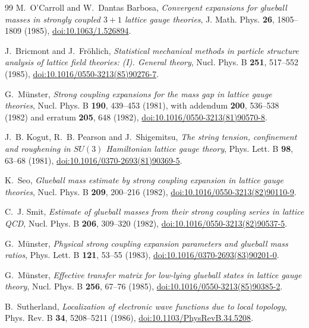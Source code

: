 \documentclass[11pt]{article}
\theoremstyle{plain}
\theoremstyle{definition}
\theoremstyle{remark}
\begin{document}
\begin{thebibliography}{99}
 M.~O'Carroll and W.~Dantas Barbosa,
  \emph{Convergent expansions for glueball masses in strongly coupled
  $3+1$ lattice gauge theories}, J. Math. Phys. \textbf{26}, 1805--1809
  (1985),
  \href{https://doi.org/10.1063/1.526894}{doi:10.1063/1.526894}.

 J.~Bricmont and J.~Fr\"ohlich,
  \emph{Statistical mechanical methods in particle structure analysis of
  lattice field theories: (I). General theory}, Nucl. Phys. B \textbf{251},
  517--552 (1985),
  \href{https://doi.org/10.1016/0550-3213(85)90276-7}{doi:10.1016/0550-3213(85)90276-7}.

 G.~M\"unster,
  \emph{Strong coupling expansions for the mass gap in lattice gauge theories},
  Nucl. Phys. B \textbf{190}, 439--453 (1981), with addendum
  \textbf{200}, 536--538 (1982) and erratum \textbf{205}, 648 (1982),
  \href{https://doi.org/10.1016/0550-3213(81)90570-8}{doi:10.1016/0550-3213(81)90570-8}.

 J.~B. Kogut, R.~B. Pearson and J.~Shigemitsu,
  \emph{The string tension, confinement and roughening in $SU(3)$ Hamiltonian
  lattice gauge theory}, Phys. Lett. B \textbf{98}, 63--68 (1981),
  \href{https://doi.org/10.1016/0370-2693(81)90369-5}{doi:10.1016/0370-2693(81)90369-5}.

 K.~Seo,
  \emph{Glueball mass estimate by strong coupling expansion in lattice gauge
  theories}, Nucl. Phys. B \textbf{209}, 200--216 (1982),
  \href{https://doi.org/10.1016/0550-3213(82)90110-9}{doi:10.1016/0550-3213(82)90110-9}.

 C.~J. Smit,
  \emph{Estimate of glueball masses from their strong coupling series in
  lattice QCD}, Nucl. Phys. B \textbf{206}, 309--320 (1982),
  \href{https://doi.org/10.1016/0550-3213(82)90537-5}{doi:10.1016/0550-3213(82)90537-5}.

 G.~M\"unster,
  \emph{Physical strong coupling expansion parameters and glueball mass
  ratios}, Phys. Lett. B \textbf{121}, 53--55 (1983),
  \href{https://doi.org/10.1016/0370-2693(83)90201-0}{doi:10.1016/0370-2693(83)90201-0}.

 G.~M\"unster,
  \emph{Effective transfer matrix for low-lying glueball states in lattice
  gauge theory}, Nucl. Phys. B \textbf{256}, 67--76 (1985),
  \href{https://doi.org/10.1016/0550-3213(85)90385-2}{doi:10.1016/0550-3213(85)90385-2}.

 B.~Sutherland,
  \emph{Localization of electronic wave functions due to local topology},
  Phys. Rev. B \textbf{34}, 5208--5211 (1986),
  \href{https://doi.org/10.1103/PhysRevB.34.5208}{doi:10.1103/PhysRevB.34.5208}.


\end{thebibliography}
\end{document}
